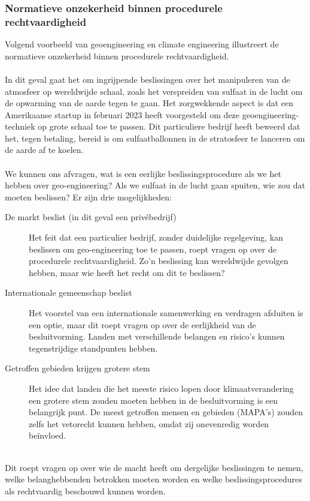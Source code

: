 \documentclass[../summary.tex]{subfiles}
\begin{document}
	\subsubsection{Normatieve onzekerheid binnen procedurele rechtvaardigheid}
	
	Volgend voorbeeld van geoengineering en climate engineering illustreert de normatieve onzekerheid binnen procedurele rechtvaardigheid. \\
	\\
	In dit geval gaat het om ingrijpende beslissingen over het manipuleren van de atmosfeer op wereldwijde schaal, zoals het verspreiden van sulfaat in de lucht om de opwarming van de aarde tegen te gaan. Het zorgwekkende aspect is dat een Amerikaanse startup in februari 2023 heeft voorgesteld om deze geoengineering-techniek op grote schaal toe te passen. Dit particuliere bedrijf heeft beweerd dat het, tegen betaling, bereid is om sulfaatballonnen in de stratosfeer te lanceren om de aarde af te koelen.\\
	\\
	We kunnen ons afvragen, wat is een eerlijke beslissingsprocedure als we het hebben over geo-engineering? Als we sulfaat in de lucht gaan spuiten, wie zou dat moeten beslissen? Er zijn drie mogelijkheden:
	
	\begin{description}
		\item[De markt beslist (in dit geval een privébedrijf)] Het feit dat een particulier bedrijf, zonder duidelijke regelgeving, kan beslissen om geo-engineering toe te passen, roept vragen op over de procedurele rechtvaardigheid. Zo'n beslissing kan wereldwijde gevolgen hebben, maar wie heeft het recht om dit te beslissen?
		\item[Internationale gemeenschap beslist] Het voorstel van een internationale samenwerking en verdragen afsluiten is een optie, maar dit roept vragen op over de eerlijkheid van de besluitvorming. Landen met verschillende belangen en risico's kunnen tegenstrijdige standpunten hebben.
		\item[Getroffen gebieden krijgen grotere stem] Het idee dat landen die het meeste risico lopen door klimaatverandering een grotere stem zouden moeten hebben in de besluitvorming is een belangrijk punt. De meest getroffen mensen en gebieden (MAPA's) zouden zelfs het vetorecht kunnen hebben, omdat zij onevenredig worden beïnvloed.
	\end{description}
	
	\ \\
	Dit roept vragen op over wie de macht heeft om dergelijke beslissingen te nemen, welke belanghebbenden betrokken moeten worden en welke beslissingsprocedures als rechtvaardig beschouwd kunnen worden. \\
	\\
	
	
\end{document}
